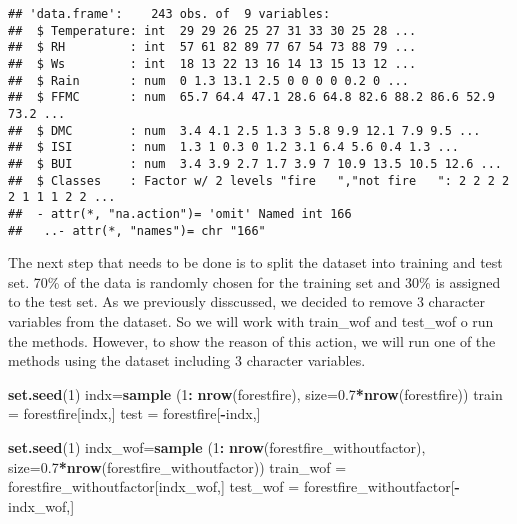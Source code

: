 \documentclass[
]{article}
\newenvironment{Shaded}{\begin{snugshade}}{\end{snugshade}}
\newcommand{\DataTypeTok}[1]{\textcolor[rgb]{0.13,0.29,0.53}{#1}}
\newcommand{\DecValTok}[1]{\textcolor[rgb]{0.00,0.00,0.81}{#1}}
\newcommand{\FloatTok}[1]{\textcolor[rgb]{0.00,0.00,0.81}{#1}}
\newcommand{\KeywordTok}[1]{\textcolor[rgb]{0.13,0.29,0.53}{\textbf{#1}}}
\newcommand{\NormalTok}[1]{#1}
\newcommand{\OperatorTok}[1]{\textcolor[rgb]{0.81,0.36,0.00}{\textbf{#1}}}
\newcommand{\StringTok}[1]{\textcolor[rgb]{0.31,0.60,0.02}{#1}}
\begin{document}
\begin{verbatim}
## 'data.frame':    243 obs. of  9 variables:
##  $ Temperature: int  29 29 26 25 27 31 33 30 25 28 ...
##  $ RH         : int  57 61 82 89 77 67 54 73 88 79 ...
##  $ Ws         : int  18 13 22 13 16 14 13 15 13 12 ...
##  $ Rain       : num  0 1.3 13.1 2.5 0 0 0 0 0.2 0 ...
##  $ FFMC       : num  65.7 64.4 47.1 28.6 64.8 82.6 88.2 86.6 52.9 73.2 ...
##  $ DMC        : num  3.4 4.1 2.5 1.3 3 5.8 9.9 12.1 7.9 9.5 ...
##  $ ISI        : num  1.3 1 0.3 0 1.2 3.1 6.4 5.6 0.4 1.3 ...
##  $ BUI        : num  3.4 3.9 2.7 1.7 3.9 7 10.9 13.5 10.5 12.6 ...
##  $ Classes    : Factor w/ 2 levels "fire   ","not fire   ": 2 2 2 2 2 1 1 1 2 2 ...
##  - attr(*, "na.action")= 'omit' Named int 166
##   ..- attr(*, "names")= chr "166"
\end{verbatim}

The next step that needs to be done is to split the dataset into
training and test set. 70\% of the data is randomly chosen for the
training set and 30\% is assigned to the test set. As we previously
disscussed, we decided to remove 3 character variables from the dataset.
So we will work with train\_wof and test\_wof o run the methods.
However, to show the reason of this action, we will run one of the
methods using the dataset including 3 character variables.

\begin{Shaded}
\begin{Highlighting}[]
\KeywordTok{set.seed}\NormalTok{(}\DecValTok{1}\NormalTok{)}
\NormalTok{indx=}\KeywordTok{sample}\NormalTok{ (}\DecValTok{1}\OperatorTok{:}\StringTok{ }\KeywordTok{nrow}\NormalTok{(forestfire), }\DataTypeTok{size=}\FloatTok{0.7}\OperatorTok{*}\KeywordTok{nrow}\NormalTok{(forestfire))}
\NormalTok{train =}\StringTok{ }\NormalTok{forestfire[indx,]}
\NormalTok{test =}\StringTok{ }\NormalTok{forestfire[}\OperatorTok{-}\NormalTok{indx,]}
\end{Highlighting}
\end{Shaded}

\begin{Shaded}
\begin{Highlighting}[]
\KeywordTok{set.seed}\NormalTok{(}\DecValTok{1}\NormalTok{)}
\NormalTok{indx_wof=}\KeywordTok{sample}\NormalTok{ (}\DecValTok{1}\OperatorTok{:}\StringTok{ }\KeywordTok{nrow}\NormalTok{(forestfire_withoutfactor),}
                 \DataTypeTok{size=}\FloatTok{0.7}\OperatorTok{*}\KeywordTok{nrow}\NormalTok{(forestfire_withoutfactor))}
\NormalTok{train_wof =}\StringTok{ }\NormalTok{forestfire_withoutfactor[indx_wof,]}
\NormalTok{test_wof =}\StringTok{ }\NormalTok{forestfire_withoutfactor[}\OperatorTok{-}\NormalTok{indx_wof,]}
\end{Highlighting}
\end{Shaded}
\end{document}
